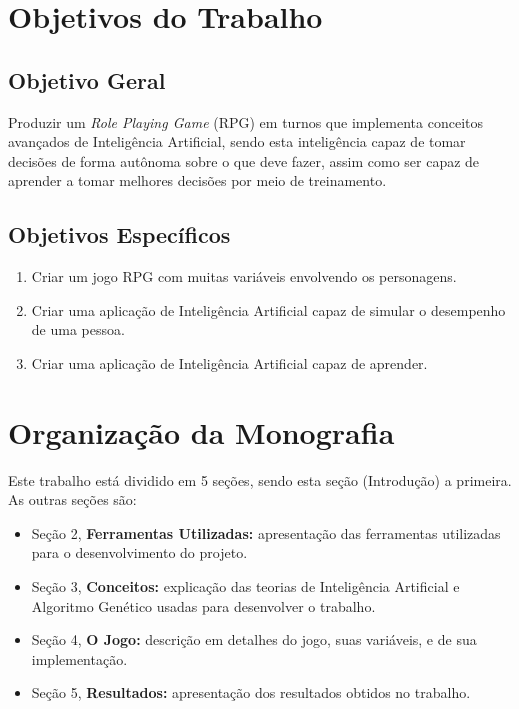 \documentclass[
	12pt,					%
	openright,				%
	oneside,				%
	a4paper,				%
	bibjustif,				%
	chapter=TITLE,			%
	english,				%
	brazil,					%
	]{abntex2}
\begin{document}
	\FloatBarrier
	\section{Objetivos do Trabalho}
	
		\FloatBarrier
		\subsection{Objetivo Geral}
			Produzir um \textit{Role Playing Game} (RPG) em turnos que implementa conceitos avançados de Inteligência Artificial,
			sendo esta inteligência capaz de tomar decisões de forma autônoma sobre o que deve fazer,
			assim como ser capaz de aprender a tomar melhores decisões por meio de treinamento.
		
		\FloatBarrier
		\subsection{Objetivos Específicos}
			\begin{enumerate}[noitemsep]
				\item Criar um jogo RPG com muitas variáveis envolvendo os personagens.
				\item Criar uma aplicação de Inteligência Artificial capaz de simular o desempenho de uma pessoa.
				\item Criar uma aplicação de Inteligência Artificial capaz de aprender.
			\end{enumerate}			
	
	\FloatBarrier
	\section{Organização da Monografia}
		Este trabalho está dividido em 5 seções, sendo esta seção (Introdução) a primeira. As outras seções são:
		\begin{itemize}[noitemsep]
     		\item Seção 2, \textbf{Ferramentas Utilizadas:} apresentação das ferramentas utilizadas para o desenvolvimento do projeto.
     		\item Seção 3, \textbf{Conceitos:} explicação das teorias de Inteligência Artificial e Algoritmo Genético usadas para desenvolver o trabalho.
     		\item Seção 4, \textbf{O Jogo:} descrição em detalhes do jogo, suas variáveis, e de sua implementação.
     		\item Seção 5, \textbf{Resultados:} apresentação dos resultados obtidos no trabalho.
  	 	\end{itemize}
\end{document}

